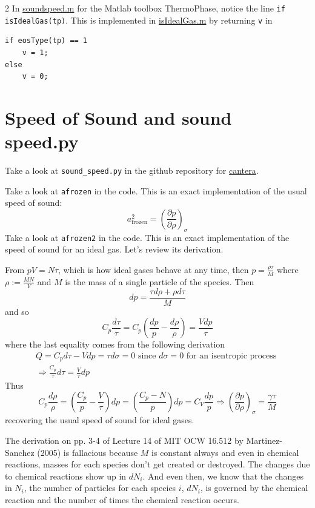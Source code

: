 \documentclass[10pt]{amsart}
\begin{document}
\begin{multicols*}{2}
In \href{https://github.com/Cantera/cantera/blob/master/interfaces/matlab/toolbox/@ThermoPhase/soundspeed.m}{soundspeed.m} for the Matlab toolbox ThermoPhase, notice the line \verb|if isIdealGas(tp)|.  This is implemented in \href{https://github.com/Cantera/cantera/blob/5926d2db7c0d4919b75ee50828b0adab4e691a51/interfaces/matlab/toolbox/%40ThermoPhase/isIdealGas.m}{isIdealGas.m} by returning \verb|v| in 
\begin{lstlisting}
if eosType(tp) == 1
    v = 1;
else
    v = 0;
\end{lstlisting}



\section{Speed of Sound and sound speed.py}

Take a look at \verb|sound_speed.py| in the github repository for \href{https://github.com/Cantera/cantera/blob/master/interfaces/cython/cantera/examples/thermo/sound_speed.py}{cantera}.

Take a look at \verb|afrozen| in the code.  This is an exact implementation of the usual speed of sound:
\[
a^2_{\text{frozen}} = \left( \frac{ \partial p}{ \partial \rho} \right)_{\sigma}
\]
Take a look at \verb|afrozen2| in the code.  This is an exact implementation of the speed of sound for an ideal gas.  Let's review its derivation.  

From $pV=N\tau$, which is how ideal gases behave at any time, then $p = \frac{\rho \tau}{M}$ where $\rho := \frac{MN}{V}$ and $M$ is the mass of a single particle of the species.  Then
\[
dp = \frac{ \tau d\rho + \rho d\tau }{ M }
\]
and so
\[
C_p \frac{d\tau}{\tau} = C_p \left( \frac{dp}{p} - \frac{d\rho}{\rho} \right) = \frac{Vdp}{\tau}
\]
where the last equality comes from the following derivation
\[
\begin{gathered}
  Q = C_pd\tau - Vdp = \tau d\sigma = 0 \text{ since $d\sigma=0$ for an isentropic process } \\ 
  \Longrightarrow \frac{C_p }{\tau} d\tau = \frac{V}{\tau} dp
\end{gathered}
\]
Thus
\[
C_p \frac{d\rho}{\rho} = \left( \frac{C_p}{p} - \frac{V}{\tau} \right) dp = \left( \frac{C_p - N}{p} \right)dp = C_V \frac{dp}{p} \Longrightarrow \left( \frac{ \partial p}{ \partial \rho} \right)_{\sigma} = \frac{\gamma \tau}{M}
\]
recovering the usual speed of sound for ideal gases.  

The derivation on pp. 3-4 of Lecture 14 of MIT OCW 16.512 by Martinez-Sanchez (2005) \cite{MMartinez-Sanchez2005} is fallacious because $M$ is constant always and even in chemical reactions, masses for each species don't get created or destroyed.  The changes due to chemical reactions show up in $dN_i$.  And even then, we know that the changes in $N_i$, the number of particles for each species $i$, $dN_i$, is governed by the chemical reaction and the number of times the chemical reaction occurs.


\end{multicols*}
\end{document}
